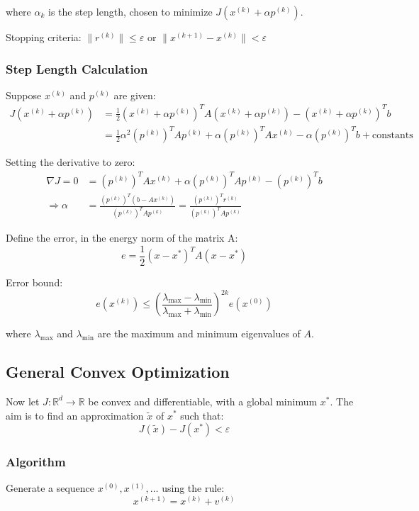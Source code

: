 where $\alpha_k$ is the step length, chosen to minimize $J(x^{(k)} + \alpha p^{(k)})$.

Stopping criteria: $\|r^{(k)}\| \leq \varepsilon$ or $\|x^{(k+1)} - x^{(k)}\| < \varepsilon$

\subsubsection*{Step Length Calculation}
Suppose $x^{(k)}$ and $p^{(k)}$ are given:
\[
\begin{aligned}
J(x^{(k)} + \alpha p^{(k)}) &= \frac{1}{2}(x^{(k)} + \alpha p^{(k)})^T A (x^{(k)} + \alpha p^{(k)}) - (x^{(k)} + \alpha p^{(k)})^T b \\
&= \frac{1}{2}\alpha^2 (p^{(k)})^T A p^{(k)} + \alpha (p^{(k)})^T A x^{(k)} - \alpha (p^{(k)})^T b + \text{constants}
\end{aligned}
\]

Setting the derivative to zero:
\[
\begin{aligned}
\nabla J = 0 &= (p^{(k)})^T A x^{(k)} + \alpha (p^{(k)})^T A p^{(k)} - (p^{(k)})^T b \\
\Rightarrow \alpha &= \frac{(p^{(k)})^T (b -A x^{(k)} )}{(p^{(k)})^T A p^{(k)}} = \frac{(p^{(k)})^T r^{(k)}}{(p^{(k)})^T A p^{(k)}}
\end{aligned}
\]

Define the error, in the energy norm of the matrix A:
\[
e = \frac{1}{2}(x - x^*)^T A (x - x^*)
\]

Error bound:
\[
e(x^{(k)}) \leq \left(\frac{\lambda_{\max} - \lambda_{\min}}{\lambda_{\max} + \lambda_{\min}}\right)^{2k} e(x^{(0)})
\]

where $\lambda_{\max}$ and $\lambda_{\min}$ are the maximum and minimum eigenvalues of $A$.

\subsection*{General Convex Optimization}
Now let $J: \mathbb{R}^d \to \mathbb{R}$ be convex and differentiable, with a global minimum $x^*$. The aim is to find an approximation $\tilde{x}$ of $x^*$ such that:
\[
J(\tilde{x}) - J(x^*) < \varepsilon
\]

\subsubsection*{Algorithm}
Generate a sequence $x^{(0)}, x^{(1)}, \ldots$ using the rule:
\[
x^{(k+1)} = x^{(k)} + v^{(k)}
\]

